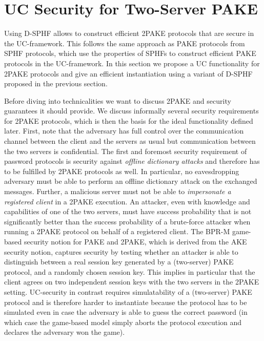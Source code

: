 \section{UC Security for Two-Server PAKE} \label{sec:uc2pake}

Using \acl{D-SPHF} allows to construct efficient \ac{2PAKE} protocols that are secure in the \ac{UC}-framework.
This follows the same approach as \ac{PAKE} protocols from \ac{SPHF} protocols, which use the properties of \acp{SPHF} to construct efficient \ac{PAKE} protocols in the \ac{UC}-framework.
In this section we propose a \ac{UC} functionality for \ac{2PAKE} protocols and give an efficient instantiation using a variant of \ac{D-SPHF} proposed in the previous section.

Before diving into technicalities we want to discuss \ac{2PAKE} and security guarantees it should provide.
We discuss informally several security requirements for \ac{2PAKE} protocols, which is then the basis for the ideal functionality \FTWOPAKE defined later.
First, note that the adversary has full control over the communication channel between the client and the servers as usual but communication between the two servers is confidential.
The first and foremost security requirement of password protocols is security against \emph{offline dictionary attacks} and therefore has to be fulfilled by \ac{2PAKE} protocols as well.
In particular, no eavesdropping adversary must be able to perform an offline dictionary attack on the exchanged messages.
Further, a malicious server must not be able to \emph{impersonate a registered client} in a \ac{2PAKE} execution.
An attacker, even with knowledge and capabilities of one of the two servers, must have success probability that is not significantly better than the success probability of a brute-force attacker when running a \ac{2PAKE} protocol on behalf of a registered client.
The \ac{BPR-M} game-based security notion for \ac{PAKE} and \ac{2PAKE}, which is derived from the AKE security notion, captures security by testing whether an attacker is able to distinguish between a real session key generated by a (two-server) \ac{PAKE} protocol, and a randomly chosen session key.
This implies in particular that the client agrees on two independent session keys with the two servers in the \ac{2PAKE} setting.
\ac{UC}-security in contrast requires simulatability of a (two-server) \ac{PAKE} protocol and is therefore harder to instantiate because the protocol has to be simulated even in case the adversary is able to guess the correct password (in which case the game-based model simply aborts the protocol execution and declares the adversary won the game).

